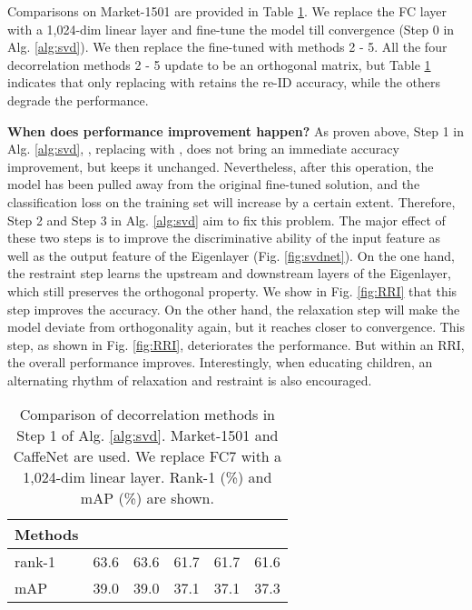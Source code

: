 \documentclass[10pt,twocolumn,letterpaper]{article}
\begin{document}
Comparisons on Market-1501 \cite{DBLP:conf/iccv/ZhengSTWWT15} are provided in Table \ref{table:USQR}. We replace the FC layer with a 1,024-dim linear layer and fine-tune the model till convergence (Step 0 in Alg. \ref{alg:svd}). We then replace the fine-tuned  with methods 2 - 5. All the four decorrelation methods 2 - 5 update  to be an orthogonal matrix, but Table \ref{table:USQR} indicates that only replacing  with  retains the re-ID accuracy,  while the others degrade the performance.

\textbf{When does performance improvement happen?} As proven above, Step 1 in Alg. \ref{alg:svd}, \ie, replacing  with , does not bring an immediate accuracy improvement, but keeps it unchanged. Nevertheless, after this operation, the model has been pulled away from the original fine-tuned solution, and the classification loss on the training set will increase by a certain extent. 
Therefore, Step 2 and Step 3 in Alg. \ref{alg:svd} aim to fix this problem. The major effect of these two steps is to improve the discriminative ability of the input feature as well as the output feature of the Eigenlayer (Fig. \ref{fig:svdnet}). 
On the one hand, the restraint step learns the upstream and downstream layers of the Eigenlayer, which still preserves the orthogonal property. We show in Fig. \ref{fig:RRI} that this step improves the accuracy. On the other hand, the relaxation step will make the model deviate from orthogonality again, but it reaches closer to convergence. This step, as shown in Fig. \ref{fig:RRI}, deteriorates the performance. But within an RRI, the overall performance improves. Interestingly, when educating children, an alternating rhythm of relaxation and restraint is also encouraged.


\begin{table}[!t]
\setlength{\tabcolsep}{5.9pt}
\renewcommand\arraystretch{1.1}
\begin{center}
\begin{tabular}{|l|c|c|c|c|c|}
\hline
Methods &  &  &  &  &  \\
\hline
rank-1 &63.6&63.6&61.7&61.7&61.6\\
\hline
mAP &39.0&39.0&37.1&37.1&37.3\\
\hline
\end{tabular}
\end{center}
\setlength{\abovecaptionskip}{-0cm} 
\caption{Comparison of decorrelation methods in Step 1 of Alg. \ref{alg:svd}. Market-1501 and CaffeNet are used. We replace FC7 with a 1,024-dim linear layer. Rank-1 (\%) and mAP (\%) are shown.}
\label{table:USQR}
\end{table}
\end{document}
